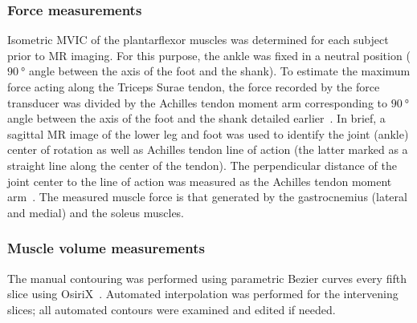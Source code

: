 \subsubsection{Force measurements}
Isometric MVIC of the plantarflexor muscles was determined for each subject prior to MR imaging. For this purpose, the ankle was fixed in a neutral position ($\SI{90}{\degree}$ angle between the axis of the foot and the shank).
To estimate the maximum force acting along the Triceps Surae tendon, the force recorded by the force transducer was divided by the Achilles tendon moment arm corresponding to $\SI{90}{\degree}$ angle between the axis of the foot and the shank detailed earlier~\cite{RNS20}.
In brief, a sagittal MR image of the lower leg and foot was used to identify the joint (ankle) center of rotation as well as Achilles tendon line of action (the latter marked as a straight line along the center of the tendon). 
The perpendicular distance of the joint center to the line of action was measured as the Achilles tendon moment arm~\cite{RNS20}.
The measured muscle force is that generated by the gastrocnemius (lateral and medial) and the soleus muscles.
\subsubsection{Muscle volume measurements}
The manual contouring was performed using parametric Bezier curves every fifth slice using OsiriX~\cite{RND22}.
Automated interpolation was performed for the intervening slices; all automated contours were examined and edited if needed.
